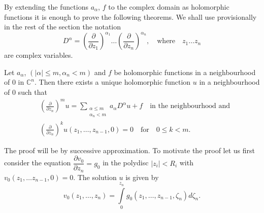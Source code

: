 By extending the functions $a_{\alpha}$, $f$ to the complex domain as holomorphic functions it is enough to prove the following theorems. We shall use provisionally in the rest of the section the notation
$$
D^{\alpha}=\left(\frac{\partial}{\partial z_{1}}\right)^{\alpha_{1}}\ldots \left(\frac{\partial}{\partial z_{n}}\right)^{\alpha_{n}},\quad\text{where}\quad z_{1}\ldots z_{n}
$$
are complex variables.

\begin{theorem}\label{appendix-thm2}
Let $a_{\alpha}$, $(|\alpha|\leq m,\alpha_{n}<m)$ and $f$ be holomorphic functions in a neighbourhood of $0$ in $\mathbb{C}^{n}$. Then there exists a unique holomorphic function $u$ in a neighbourhood of $0$ such that
\begin{align*}
& \left(\frac{\partial}{\partial z_{n}}\right)^{m}u=\sum\limits_{\substack{\alpha\leq m\\\alpha_{n}<m}}a_{\alpha}D^{\alpha}u+f\quad\text{in the neighbourhood and}\\[4pt]
& \left(\frac{\partial}{\partial z_{n}}\right)^{k}u(z_{1},\ldots,z_{n-1},0)=0\quad\text{for}\quad 0\leq k<m.
\end{align*}
\end{theorem}

The proof will be by successive approximation. To motivate the proof let us first consider the equation $\dfrac{\partial v_{0}}{\partial z_{n}}=g_{0}$ in the polydisc $|z_{i}|<R_{i}$ with $v_{0}(z_{1},\ldots z_{n-1},0)=0$. The solution $u$ is given by
$$
v_{0}(z_{1},\ldots,z_{n})=\int\limits^{z_{n}}_{0}g_{0}(z_{1},\ldots,z_{n-1},\zeta_{n})d\zeta_{n}.
$$

